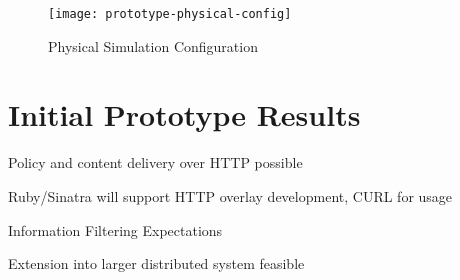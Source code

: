 \begin{figure}[!t]
\centering
\texttt{[image: prototype-physical-config]}
\caption{Physical Simulation Configuration}
\label{fig:model:prototype-physical-config}
\end{figure}

\section{Initial Prototype Results}

Policy and content delivery over HTTP possible

Ruby/Sinatra will support HTTP overlay development, CURL for usage

Information Filtering Expectations

Extension into larger distributed system feasible

